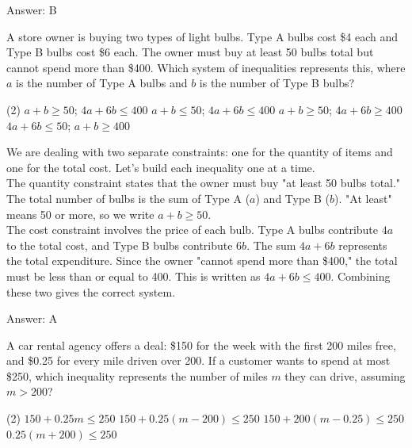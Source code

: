 \documentclass[11pt,paper=a4,answers]{exam}
\begin{document}
\begin{questions}
\begin{solution}
\vspace{15pt}
Answer: \colorbox{yellow!100}{B}
\end{solution}

\question
A store owner is buying two types of light bulbs. Type A bulbs cost \$4 each and Type B bulbs cost \$6 each. The owner must buy at least 50 bulbs total but cannot spend more than \$400. Which system of inequalities represents this, where $a$ is the number of Type A bulbs and $b$ is the number of Type B bulbs?
\begin{tasks}(2)
    \task $a + b \geq 50$; $4a + 6b \leq 400$
    \task $a + b \leq 50$; $4a + 6b \leq 400$
    \task $a + b \geq 50$; $4a + 6b \geq 400$
    \task $4a + 6b \leq 50$; $a + b \geq 400$
\end{tasks}

\begin{solution}
We are dealing with two separate constraints: one for the quantity of items and one for the total cost. Let's build each inequality one at a time.
\\[10pt]
The quantity constraint states that the owner must buy "at least 50 bulbs total." The total number of bulbs is the sum of Type A ($a$) and Type B ($b$). "At least" means 50 or more, so we write $a + b \geq 50$.
\\[10pt]
The cost constraint involves the price of each bulb. Type A bulbs contribute $4a$ to the total cost, and Type B bulbs contribute $6b$. The sum $4a + 6b$ represents the total expenditure. Since the owner "cannot spend more than \$400," the total must be less than or equal to 400. This is written as $4a + 6b \leq 400$. Combining these two gives the correct system.

\vspace{15pt}
Answer: \colorbox{yellow!100}{A}
\end{solution}

\question
A car rental agency offers a deal: \$150 for the week with the first 200 miles free, and \$0.25 for every mile driven over 200. If a customer wants to spend at most \$250, which inequality represents the number of miles $m$ they can drive, assuming $m > 200$?
\begin{tasks}(2)
    \task $150 + 0.25m \leq 250$
    \task $150 + 0.25(m - 200) \leq 250$
    \task $150 + 200(m - 0.25) \leq 250$
    \task $0.25(m + 200) \leq 250$
\end{tasks}


\end{questions}
\end{document}
